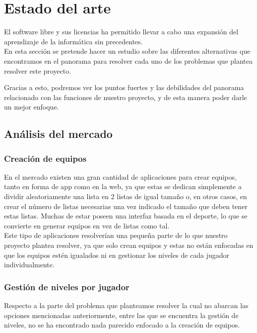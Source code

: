 \chapter{Estado del arte}

El software libre y sus licencias \cite{gplv3} ha permitido llevar a cabo una expansión del
aprendizaje de la informática sin precedentes.\\

En esta sección se pretende hacer un estudio sobre las diferentes alternativas
que encontramos en el panorama para resolver cada uno de los problemas que plantea
resolver este proyecto.

Gracias a esto, podremos ver los puntos fuertes y las debilidades del panorama relacionado
con las funciones de nuestro proyecto, y de esta manera poder darle un mejor enfoque.

\section{Análisis del mercado}

\subsection{Creación de equipos}

En el mercado existen una gran cantidad de aplicaciones para crear equipos, tanto en forma de app como en la web,
ya que estas se dedican simplemente a dividir aleatoriamente una lista en 2 listas de igual tamaño o, en otros casos,
en crear el número de listas necesarias una vez indicado el tamaño que deben tener estas listas.
Muchas de estar poseen una interfaz basada en el deporte, lo que se convierte en generar equipos en vez de listas como tal.\\

Este tipo de aplicaciones resolverían una pequeña parte de lo que nuestro proyecto plantea resolver, ya que solo crean equipos
y estas no están enfocadas en que los equipos estén igualados ni en gestionar los niveles de cada jugador individualmente.

\newpage

\subsection{Gestión de niveles por jugador}

Respecto a la parte del problema que planteamos resolver la cual no abarcan las opciones mencionadas anteriormente, entre las que
se encuentra la gestión de niveles, no se ha encontrado nada parecido enfocado a la creación de equipos.

